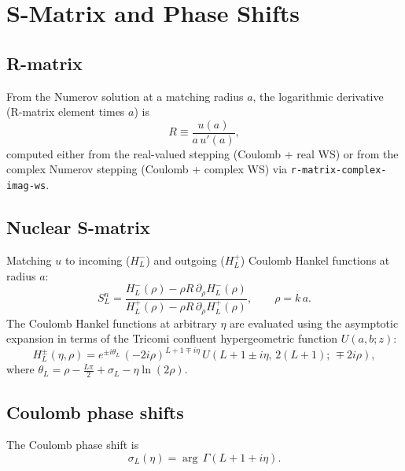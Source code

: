 \documentclass[12pt,a4paper]{article}
\begin{document}
\section{S-Matrix and Phase Shifts}

\subsection{R-matrix}

From the Numerov solution at a matching radius $a$, the logarithmic
derivative (R-matrix element times $a$) is
\begin{equation}
  R \equiv \frac{u(a)}{a\,u'(a)},
\end{equation}
computed either from the real-valued stepping (Coulomb + real WS) or
from the complex Numerov stepping (Coulomb + complex WS) via
\texttt{r-matrix-complex-imag-ws}.

\subsection{Nuclear S-matrix}

Matching $u$ to incoming ($H_L^-$) and outgoing ($H_L^+$) Coulomb
Hankel functions at radius $a$:
\begin{equation}
  S_L^n = \frac{H_L^-(\rho) - \rho R\,\partial_\rho H_L^-(\rho)}
               {H_L^+(\rho) - \rho R\,\partial_\rho H_L^+(\rho)},
  \qquad \rho = k\,a.
  \label{eq:s-matrix}
\end{equation}
The Coulomb Hankel functions at arbitrary $\eta$ are evaluated using
the asymptotic expansion in terms of the Tricomi confluent
hypergeometric function $U(a,b;z)$:
\begin{equation}
  H_L^\pm(\eta,\rho) = e^{\pm i\theta_L}\,(-2i\rho)^{L+1\mp i\eta}\,
  U\!\left(L+1\pm i\eta,\,2(L+1);\,\mp 2i\rho\right),
\end{equation}
where $\theta_L = \rho - \tfrac{L\pi}{2} + \sigma_L - \eta\ln(2\rho)$.

\subsection{Coulomb phase shifts}

The Coulomb phase shift is
\begin{equation}
  \sigma_L(\eta) = \arg\,\Gamma(L+1+i\eta).
  \label{eq:coulomb-sigma}
\end{equation}
\end{document}
